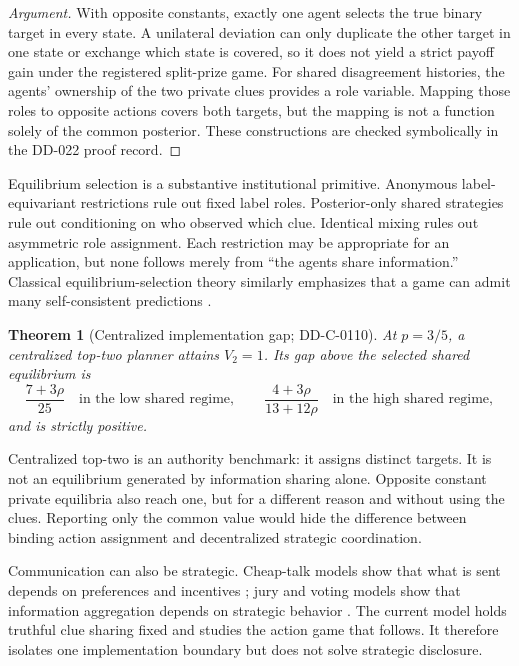 \documentclass[12pt]{article}
\newtheorem{theorem}{Theorem}
\theoremstyle{definition}
\begin{document}
\begin{proof}[Argument]
With opposite constants, exactly one agent selects the true binary target in
every state. A unilateral deviation can only duplicate the other target in one
state or exchange which state is covered, so it does not yield a strict payoff
gain under the registered split-prize game. For shared disagreement histories,
the agents' ownership of the two private clues provides a role variable. Mapping
those roles to opposite actions covers both targets, but the mapping is not a
function solely of the common posterior. These constructions are checked
symbolically in the DD-022 proof record.
\end{proof}



Equilibrium selection is a substantive institutional primitive. Anonymous
label-equivariant restrictions rule out fixed label roles. Posterior-only shared
strategies rule out conditioning on who observed which clue. Identical mixing
rules out asymmetric role assignment. Each restriction may be appropriate for
an application, but none follows merely from ``the agents share information.''
Classical equilibrium-selection theory similarly emphasizes that a game can
admit many self-consistent predictions \citep{HarsanyiSelten1988}.

\begin{theorem}[Centralized implementation gap; DD-C-0110]
At $p=3/5$, a centralized top-two planner attains $V_2=1$. Its gap above the
selected shared equilibrium is
\[
 \frac{7+3\rho}{25}\quad\text{in the low shared regime},
 \qquad
 \frac{4+3\rho}{13+12\rho}\quad\text{in the high shared regime},
\]
and is strictly positive.
\end{theorem}

Centralized top-two is an authority benchmark: it assigns distinct targets. It
is not an equilibrium generated by information sharing alone. Opposite constant
private equilibria also reach one, but for a different reason and without using
the clues. Reporting only the common value would hide the difference between
binding action assignment and decentralized strategic coordination.

Communication can also be strategic. Cheap-talk models show that what is sent
depends on preferences and incentives \citep{CrawfordSobel1982}; jury and voting
models show that information aggregation depends on strategic behavior
\citep{AustenSmithBanks1996,LevyRazin2015}. The current model holds truthful clue
sharing fixed and studies the action game that follows. It therefore isolates
one implementation boundary but does not solve strategic disclosure.
\end{document}
